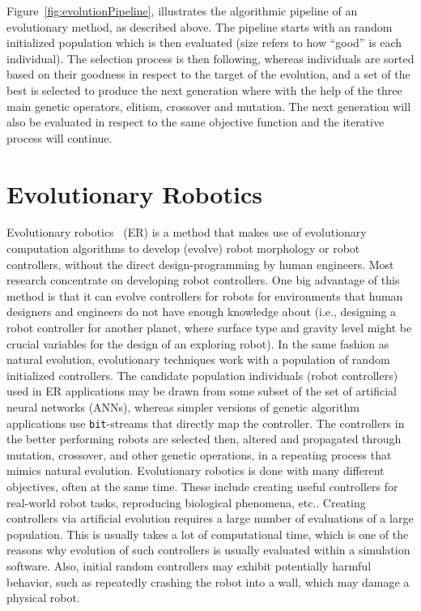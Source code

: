 Figure~\ref{fig:evolutionPipeline}, illustrates the algorithmic pipeline of an evolutionary method, as described above. The pipeline starts with an random initialized population which is then evaluated (size refers to how ``good'' is each individual). The selection process is then following, whereas individuals are sorted based on their goodness in respect to the target of the evolution, and a set of the best is selected to produce the next generation where with the help of the three main genetic operators, elitism, crossover and mutation. The next generation will also be evaluated in respect to the same objective function and the iterative process will continue.

\section{Evolutionary Robotics}
\label{sec:evolutionary_robotics}

Evolutionary robotics~\cite{WikievolutionaryRobotics} (ER) is a method that makes use of evolutionary computation algorithms to develop (evolve) robot morphology or robot controllers, without the direct design-programming by human engineers. Most research concentrate on developing robot controllers. One big advantage of this method is that it can evolve controllers for robots for environments that human designers and engineers do not have enough knowledge about (i.e., designing a robot controller for another planet, where surface type and gravity level might be crucial variables for the design of an exploring robot). In the same fashion as natural evolution, evolutionary techniques work with a population of random initialized controllers. The candidate population individuals (robot controllers) used in ER applications may be drawn from some subset of the set of artificial neural networks (ANNs), whereas simpler versions of genetic algorithm applications use \texttt{bit}-streams that directly map the controller. The controllers in the better performing robots are selected then, altered and propagated through mutation, crossover, and other genetic operations, in a repeating process that mimics natural evolution. Evolutionary robotics is done with many different objectives, often at the same time. These include creating useful controllers for real-world robot tasks, reproducing biological phenomena, etc.. Creating controllers via artificial evolution requires a large number of evaluations of a large population. This is usually takes a lot of computational time, which is one of the reasons why evolution of such controllers is usually evaluated within a simulation software. Also, initial random controllers may exhibit potentially harmful behavior, such as repeatedly crashing the robot into a wall, which may damage a physical robot.

